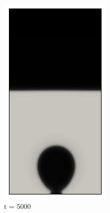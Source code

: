 \begin{figure}[h!]
	\centering
	\begin{subfigure}{0.25\textwidth}
		\includegraphics[width=\linewidth]{figs/cap4/bubble_5}
		\caption{t = 5000}
		\label{fig:1}
	\end{subfigure}\hfil 
	\begin{subfigure}{0.25\textwidth}

\end{subfigure}
\end{figure}
